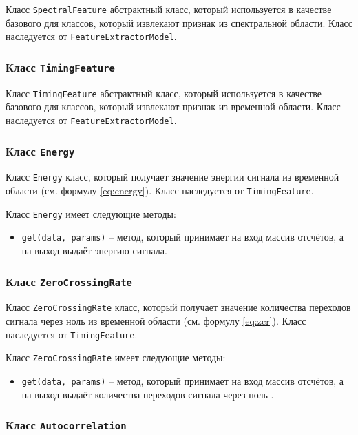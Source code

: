 Класс \texttt{SpectralFeature} абстрактный класс, который используется в качестве базового для классов, который извлекают признак из спектральной области. Класс наследуется от \texttt{FeatureExtractorModel}.

\subsubsection{Класс \texttt{TimingFeature}}

Класс \texttt{TimingFeature} абстрактный класс, который используется в качестве базового для классов, который извлекают признак из временной области. Класс наследуется от \texttt{FeatureExtractorModel}.


\subsubsection{Класс \texttt{Energy}}

Класс \texttt{Energy} класс, который получает значение энергии сигнала из временной области (см. формулу \ref{eq:energy}). Класс наследуется от \texttt{TimingFeature}.

Класс \texttt{Energy} имеет следующие методы:

\begin{itemize}
\item{\texttt{get(data, params)} --  метод, который принимает на вход массив отсчётов, а на выход выдаёт энергию сигнала. }
\end{itemize}


\subsubsection{Класс \texttt{ZeroCrossingRate}}

Класс \texttt{ZeroCrossingRate} класс, который получает значение количества переходов сигнала через ноль из временной области (см. формулу \ref{eq:zcr}). Класс наследуется от \texttt{TimingFeature}.

Класс \texttt{ZeroCrossingRate} имеет следующие методы:

\begin{itemize}
\item{\texttt{get(data, params)} --  метод, который принимает на вход массив отсчётов, а на выход выдаёт количества переходов сигнала через ноль . }
\end{itemize}


\subsubsection{Класс \texttt{Autocorrelation}}

